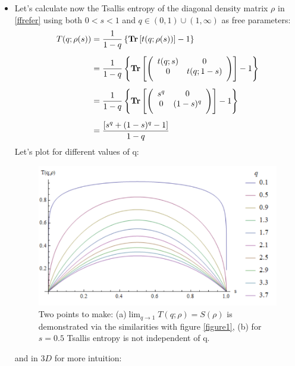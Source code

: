 \begin{itemize}
\item
Let's calculate now the Tsallis entropy of the diagonal density matrix $\rho$ in \eqref{ffrefer} using both $0<s<1$ and $q \in(0,1) \cup(1, \infty)$ as free parameters:
\begin{align}
T(q;\rho(s)) 
&= \frac{1}{1-q} \left \{ \operatorname{\textup{\textbf{Tr}}} \left[ t(q;\rho(s)) \right]-1 \right\} \\[0.5em]
&= \frac{1}{1-q} \left\{  \operatorname{\textup{\textbf{Tr}}} \left[ \left(
\begin{array}{cc}
 t(q;s) & 0 \\
 0 & t(q;1-s) \\[0.5em]
\end{array}
\right) \right]-1 \right\}\\[0.5em]
&=
\frac{1}{1-q} \left\{  \operatorname{\textup{\textbf{Tr}}} \left[ \left(
\begin{array}{cc}
 s^{q} & 0 \\
 0 & (1-s)^{q} \\[0.5em]
\end{array}
\right) \right]-1 \right\} \\[0.5em] 
&=\frac{\left[ s^{q }+(1-s)^{q }-1 \right]}{1-q}
\end{align}
Let's plot for different values of q:
\begin{figure}[H]
\begin{center}
\includegraphics[scale=0.8]{figures/tsallis_ent_plot.png}
\caption{Two points to make: (a)$\lim_{q \to 1}T(q;\rho) = S(\rho)$ is demonstrated via the similarities with figure \ref{figure1}, (b) for $s=0.5$ Tsallis entropy is not independent of q.}
\end{center}
\end{figure}
and in $3D$ for more intuition:
\begin{figure}[H]
\begin{center}

\end{center}
\end{figure}
\end{itemize}
